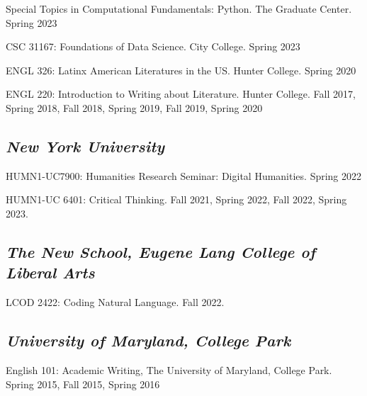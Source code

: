 \documentclass[a4paper,11pt]{article}
\begin{document}
Special Topics in Computational Fundamentals: Python. The Graduate
Center. Spring 2023

CSC 31167: Foundations of Data Science. City College. Spring 2023

ENGL 326: Latinx American Literatures in the US. Hunter College.
Spring 2020

ENGL 220: Introduction to Writing about Literature. Hunter College.
Fall 2017, Spring 2018, Fall 2018, Spring 2019, Fall 2019, Spring 2020

\subsection*{\emph{New York University}}
\label{sec:org710e811}

HUMN1-UC7900: Humanities Research Seminar: Digital Humanities. Spring
2022

HUMN1-UC 6401: Critical Thinking. Fall 2021, Spring 2022, Fall 2022,
Spring 2023.

\subsection*{\emph{The New School, Eugene Lang College of Liberal Arts}}
\label{sec:orga28761d}

LCOD 2422: Coding Natural Language. Fall 2022.

\subsection*{\emph{University of Maryland, College Park}}
\label{sec:org5a98982}

English 101: Academic Writing, The University of Maryland, College
Park. Spring 2015, Fall 2015, Spring 2016
\end{document}
